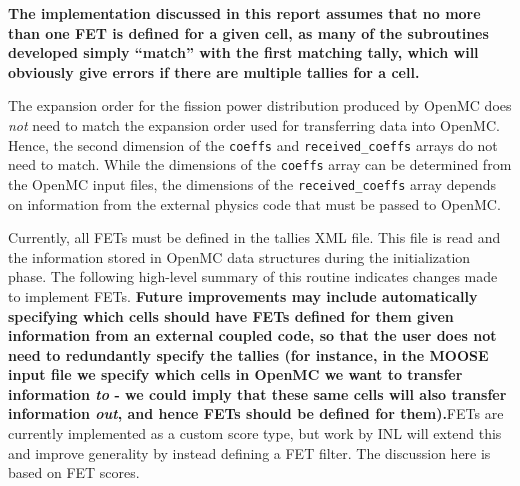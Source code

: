 \documentclass[10pt]{article}
\newcounter{subsubsubsection}[subsubsection]
\numberwithin{equation}{section} %
\begin{document}
{\bf The implementation discussed in this report assumes that no more than one FET is defined for a given cell, as many of the subroutines developed simply ``match'' with the first matching tally, which will obviously give errors if there are multiple tallies for a cell.}

The expansion order for the fission power distribution produced by OpenMC does {\it not} need to match the expansion order used for transferring data into OpenMC. Hence, the second dimension of the {\tt coeffs} and {\tt received\_coeffs} arrays do not need to match. While the dimensions of the {\tt coeffs} array can be determined from the OpenMC input files, the dimensions of the {\tt received\_coeffs} array depends on information from the external physics code that must be passed to OpenMC.

Currently, all FETs must be defined in the tallies XML file. This file is read and the information stored in OpenMC data structures during the initialization phase. The following high-level summary of this routine indicates changes made to implement FETs. {\bf Future improvements may include automatically specifying which cells should have FETs defined for them given information from an external coupled code, so that the user does not need to redundantly specify the tallies (for instance, in the MOOSE input file we specify which cells in OpenMC we want to transfer information {\it to} - we could imply that these same cells will also transfer information {\it out}, and hence FETs should be defined for them).}FETs are currently implemented as a custom score type, but work by INL will extend this and improve generality by instead defining a FET filter. The discussion here is based on FET scores. 
\end{document}
